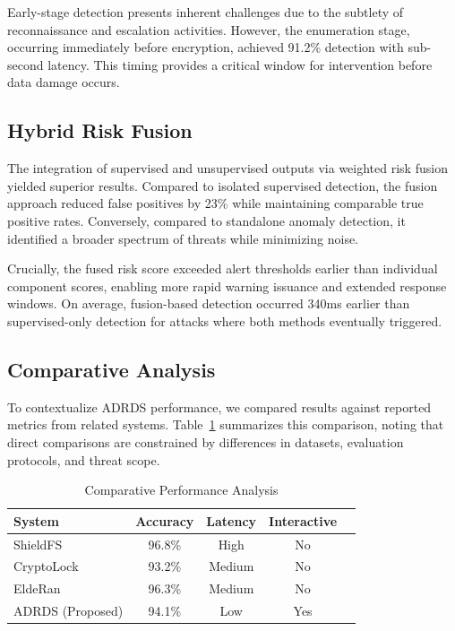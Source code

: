 Early-stage detection presents inherent challenges due to the subtlety of reconnaissance and escalation activities. However, the enumeration stage, occurring immediately before encryption, achieved 91.2\% detection with sub-second latency. This timing provides a critical window for intervention before data damage occurs.

\subsection{Hybrid Risk Fusion}

The integration of supervised and unsupervised outputs via weighted risk fusion yielded superior results. Compared to isolated supervised detection, the fusion approach reduced false positives by 23\% while maintaining comparable true positive rates. Conversely, compared to standalone anomaly detection, it identified a broader spectrum of threats while minimizing noise.

Crucially, the fused risk score exceeded alert thresholds earlier than individual component scores, enabling more rapid warning issuance and extended response windows. On average, fusion-based detection occurred 340ms earlier than supervised-only detection for attacks where both methods eventually triggered.

\subsection{Comparative Analysis}

To contextualize ADRDS performance, we compared results against reported metrics from related systems. Table~\ref{tab:comparison} summarizes this comparison, noting that direct comparisons are constrained by differences in datasets, evaluation protocols, and threat scope.

\begin{table}[t]
\centering
\caption{Comparative Performance Analysis}
\label{tab:comparison}
\begin{tabular}{lcccc}
\hline
\textbf{System} & \textbf{Accuracy} & \textbf{Latency} & \textbf{Interactive} \\
\hline
ShieldFS \cite{continella2016shieldfs} & 96.8\% & High & No \\
CryptoLock \cite{scaife2016cryptolock} & 93.2\% & Medium & No \\
EldeRan \cite{sgandurra2016automated} & 96.3\% & Medium & No \\
ADRDS (Proposed) & 94.1\% & Low & Yes \\
\hline
\end{tabular}
\end{table}


